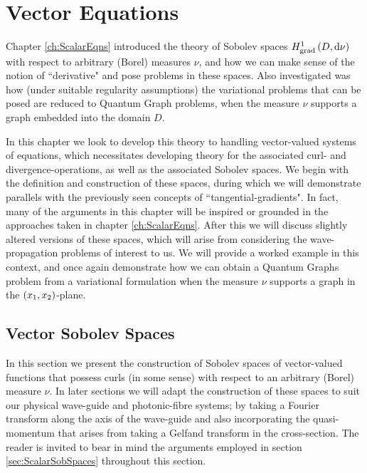 \chapter{Vector Equations} \label{ch:VectorEqns}
Chapter \ref{ch:ScalarEqns} introduced the theory of Sobolev spaces $H^1_\mathrm{grad}\left( D, \mathrm{d}\nu \right)$ with respect to arbitrary (Borel) measures $\nu$, and how we can make sense of the notion of ``derivative" and pose problems in these spaces.
Also investigated was how (under suitable regularity assumptions) the variational problems that can be posed are reduced to Quantum Graph problems, when the measure $\nu$ supports a graph embedded into the domain $D$. \newline

In this chapter we look to develop this theory to handling vector-valued systems of equations, which necessitates developing theory for the associated curl- and divergence-operations, as well as the associated Sobolev spaces.
We begin with the definition and construction of these spaces, during which we will demonstrate parallels with the previously seen concepts of ``tangential-gradients".
In fact, many of the arguments in this chapter will be inspired or grounded in the approaches taken in chapter \ref{ch:ScalarEqns}.
After this we will discuss slightly altered versions of these spaces, which will arise from considering the wave-propagation problems of interest to us.
We will provide a worked example in this context, and once again demonstrate how we can obtain a Quantum Graphs problem from a variational formulation when the measure $\nu$ supports a graph in the $\left( x_1,x_2 \right)$-plane.

\section{Vector Sobolev Spaces} \label{sec:VectorSobSpaces}
In this section we present the construction of Sobolev spaces of vector-valued functions that possess curls (in some sense) with respect to an arbitrary (Borel) measure $\nu$.
In later sections we will adapt the construction of these spaces to suit our physical wave-guide and photonic-fibre systems; by taking a Fourier transform along the axis of the wave-guide and also incorporating the quasi-momentum that arises from taking a Gelfand transform in the cross-section.
The reader is invited to bear in mind the arguments employed in section \ref{sec:ScalarSobSpaces} throughout this section. \newline

